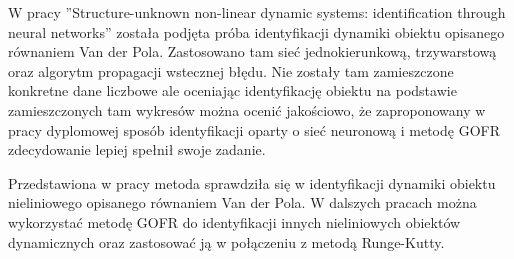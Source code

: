 W pracy ''Structure-unknown non-linear dynamic systems: identification through neural networks''\cite{Masri} została podjęta próba identyfikacji dynamiki obiektu opisanego równaniem Van der Pola. Zastosowano tam sieć jednokierunkową, trzywarstową oraz algorytm propagacji wstecznej błędu. Nie zostały tam zamieszczone konkretne dane liczbowe ale oceniając identyfikację obiektu na podstawie zamieszczonych tam wykresów można ocenić jakościowo, że zaproponowany w pracy dyplomowej sposób identyfikacji oparty o sieć neuronową i metodę GOFR zdecydowanie lepiej spełnił swoje zadanie. 

Przedstawiona w pracy metoda sprawdziła się w identyfikacji dynamiki obiektu nieliniowego opisanego równaniem Van der Pola. W dalszych pracach można wykorzystać metodę GOFR do identyfikacji innych nieliniowych obiektów dynamicznych oraz zastosować ją w połączeniu z metodą Runge-Kutty.

\clearpage

